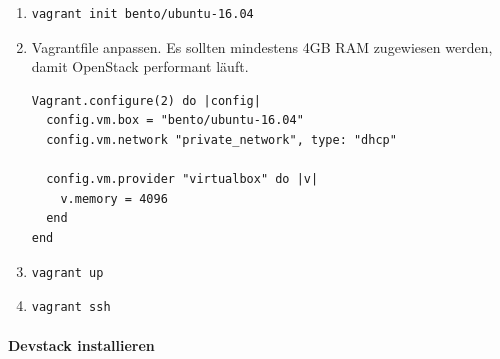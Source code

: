 \documentclass[a4paper,10pt]{article}
\begin{document}
\begin{enumerate}
 \item \begin{verbatim}vagrant init bento/ubuntu-16.04\end{verbatim}
 \item Vagrantfile anpassen. Es sollten mindestens 4GB RAM zugewiesen werden, damit OpenStack performant läuft.\\
\begin{minipage}{\textwidth}
\begin{lstlisting}
Vagrant.configure(2) do |config|
  config.vm.box = "bento/ubuntu-16.04"
  config.vm.network "private_network", type: "dhcp"
 
  config.vm.provider "virtualbox" do |v|
    v.memory = 4096
  end
end
\end{lstlisting}
\end{minipage}
 \item \begin{verbatim}vagrant up\end{verbatim}
 \item \begin{verbatim}vagrant ssh\end{verbatim}
\end{enumerate}
 
\paragraph{Devstack installieren}
  
\end{document}
